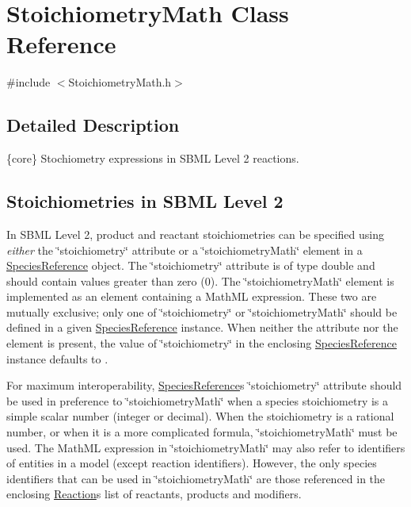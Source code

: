 \hypertarget{class_stoichiometry_math}{}\section{Stoichiometry\+Math Class Reference}
\label{class_stoichiometry_math}


{\ttfamily \#include $<$Stoichiometry\+Math.\+h$>$}



\subsection{Detailed Description}
\{core\} Stochiometry expressions in S\+B\+ML Level 2 reactions.\hypertarget{class_stoichiometry_math_l2-stoichiometries}{}\subsection{Stoichiometries in S\+B\+M\+L Level 2}\label{class_stoichiometry_math_l2-stoichiometries}
In S\+B\+ML Level 2, product and reactant stoichiometries can be specified using {\itshape either} the \char`\"{}stoichiometry\char`\"{} attribute or a \char`\"{}stoichiometry\+Math\char`\"{} element in a \hyperlink{class_species_reference}{Species\+Reference} object. The \char`\"{}stoichiometry\char`\"{} attribute is of type {\ttfamily double} and should contain values greater than zero (0). The \char`\"{}stoichiometry\+Math\char`\"{} element is implemented as an element containing a Math\+ML expression. These two are mutually exclusive; only one of \char`\"{}stoichiometry\char`\"{} or \char`\"{}stoichiometry\+Math\char`\"{} should be defined in a given \hyperlink{class_species_reference}{Species\+Reference} instance. When neither the attribute nor the element is present, the value of \char`\"{}stoichiometry\char`\"{} in the enclosing \hyperlink{class_species_reference}{Species\+Reference} instance defaults to {}.

For maximum interoperability, \hyperlink{class_species_reference}{Species\+Reference}\textquotesingle{}s \char`\"{}stoichiometry\char`\"{} attribute should be used in preference to \char`\"{}stoichiometry\+Math\char`\"{} when a species\textquotesingle{} stoichiometry is a simple scalar number (integer or decimal). When the stoichiometry is a rational number, or when it is a more complicated formula, \char`\"{}stoichiometry\+Math\char`\"{} must be used. The Math\+ML expression in \char`\"{}stoichiometry\+Math\char`\"{} may also refer to identifiers of entities in a model (except reaction identifiers). However, the only species identifiers that can be used in \char`\"{}stoichiometry\+Math\char`\"{} are those referenced in the enclosing \hyperlink{class_reaction}{Reaction}\textquotesingle{}s list of reactants, products and modifiers.

